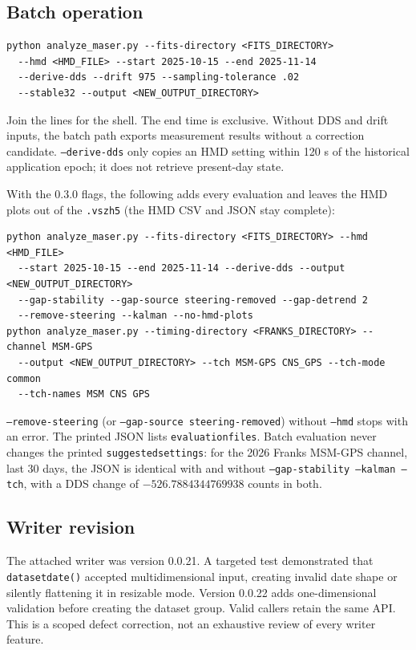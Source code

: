 \documentclass[11pt,a4paper]{article}
\renewcommand{\_}{\usscore\allowbreak}
\begin{document}
\subsection{Batch operation}
\begin{lstlisting}
python analyze_maser.py --fits-directory <FITS_DIRECTORY>
  --hmd <HMD_FILE> --start 2025-10-15 --end 2025-11-14
  --derive-dds --drift 975 --sampling-tolerance .02
  --stable32 --output <NEW_OUTPUT_DIRECTORY>
\end{lstlisting}
Join the lines for the shell. The end time is exclusive. Without DDS and drift
inputs, the batch path exports measurement results without a correction
candidate. \texttt{--derive-dds} only copies an HMD setting within 120 s of the
historical application epoch; it does not retrieve present-day state.

With the 0.3.0 flags, the following adds every evaluation and leaves the HMD plots out of the
\texttt{.vszh5} (the HMD CSV and JSON stay complete):
\begin{lstlisting}
python analyze_maser.py --fits-directory <FITS_DIRECTORY> --hmd <HMD_FILE>
  --start 2025-10-15 --end 2025-11-14 --derive-dds --output <NEW_OUTPUT_DIRECTORY>
  --gap-stability --gap-source steering-removed --gap-detrend 2
  --remove-steering --kalman --no-hmd-plots
python analyze_maser.py --timing-directory <FRANKS_DIRECTORY> --channel MSM-GPS
  --output <NEW_OUTPUT_DIRECTORY> --tch MSM-GPS CNS_GPS --tch-mode common
  --tch-names MSM CNS GPS
\end{lstlisting}
\texttt{--remove-steering} (or \texttt{--gap-source steering-removed}) without \texttt{--hmd} stops with
an error. The printed JSON lists \texttt{evaluation\_files}. Batch evaluation never changes the printed
\texttt{suggested\_settings}: for the 2026 Franks MSM-GPS channel, last 30 days, the JSON is identical with
and without \texttt{--gap-stability --kalman --tch}, with a DDS change of \(-526.7884344769938\) counts
in both.

\subsection{Writer revision}
The attached writer was version 0.0.21. A targeted test demonstrated that
\texttt{dataset\_date()} accepted multidimensional input, creating invalid
date shape or silently flattening it in resizable mode. Version 0.0.22 adds
one-dimensional validation before creating the dataset group. Valid callers
retain the same API. This is a scoped defect correction, not an exhaustive
review of every writer feature.
\end{document}

